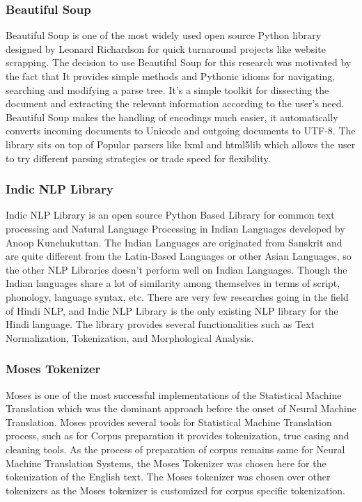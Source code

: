 \subsubsection{Beautiful Soup}
Beautiful Soup is one of the most widely used open source Python library designed by Leonard Richardson for quick turnaround projects like website scrapping. The decision to use Beautiful Soup for this research was motivated by the fact that It provides simple methods and Pythonic idioms for navigating, searching and modifying a parse tree. It’s a simple toolkit for dissecting the document and extracting the relevant information according to the user’s need. Beautiful Soup makes the handling of encodings much easier, it automatically converts incoming documents to Unicode and outgoing documents to UTF-8. The library sits on top of Popular parsers like lxml and html5lib which allows the user to try different parsing strategies or trade speed for flexibility. 
\subsubsection{Indic NLP Library}
Indic NLP Library is an open source Python Based Library for common text processing and Natural Language Processing in Indian Languages developed by Anoop Kunchukuttan.  The Indian Languages are originated from Sanskrit and are quite different from the Latin-Based Languages or other Asian Languages, so the other NLP Libraries doesn’t perform well on Indian Languages. Though the Indian languages share a lot of similarity among themselves in terms of script, phonology, language syntax, etc. There are very few researches going in the field of Hindi NLP, and Indic NLP Library is the only existing NLP library for the Hindi language. The library provides several functionalities such as Text Normalization, Tokenization, and Morphological Analysis.
\subsubsection{Moses Tokenizer}
Moses is one of the most successful implementations of the Statistical Machine Translation which was the dominant approach before the onset of Neural Machine Translation. Moses provides several tools for Statistical Machine Translation process, such as for Corpus preparation it provides tokenization, true casing and cleaning tools. As the process of preparation of corpus remains same for Neural Machine Translation Systems, the Moses Tokenizer was chosen here for the tokenization of the English text. The Moses tokenizer was chosen over other tokenizers as the Moses tokenizer is customized for corpus specific tokenization.


